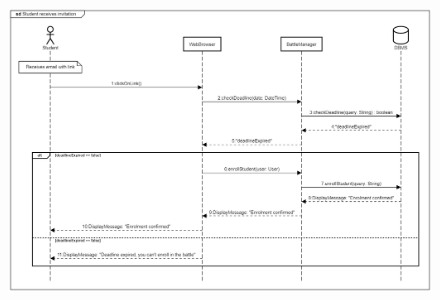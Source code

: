 \documentclass[12pt,oneside,a4paper]{article}
\begin{document}
\begin{figure}[htbp]
    \centering
    \includegraphics[width=1\linewidth]{Images//Sequence Diagrams/studentReceivesInvitation.png}
    \label{fig:enter-label}
\end{figure}

\clearpage
\end{document}
